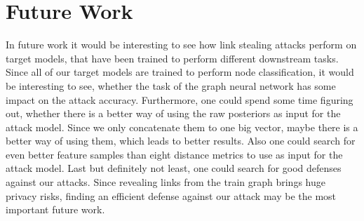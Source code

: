     \section{Future Work}
        In future work it would be interesting to see how link stealing attacks perform on target models, that have been trained to perform different downstream tasks.
        Since all of our target models are trained to perform node classification, it would be interesting to see, whether the task of the graph neural network has some impact on the attack accuracy.
        Furthermore, one could spend some time figuring out, whether there is a better way of using the raw posteriors as input for the attack model.
        Since we only concatenate them to one big vector, maybe there is a better way of using them, which leads to better results.
        Also one could search for even better feature samples than eight distance metrics to use as input for the attack model.
        Last but definitely not least, one could search for good defenses against our attacks.
        Since revealing links from the train graph brings huge privacy risks, finding an efficient defense against our attack may be the most important future work.